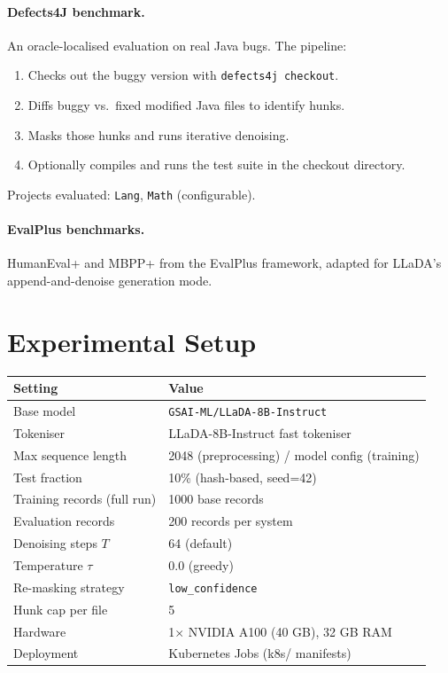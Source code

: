 \documentclass[11pt,a4paper]{article}
\begin{document}
\paragraph{Defects4J benchmark.} An oracle-localised evaluation on real Java bugs. The pipeline:
\begin{enumerate}[noitemsep]
  \item Checks out the buggy version with \texttt{defects4j checkout}.
  \item Diffs buggy vs.\ fixed modified Java files to identify hunks.
  \item Masks those hunks and runs iterative denoising.
  \item Optionally compiles and runs the test suite in the checkout directory.
\end{enumerate}
Projects evaluated: \texttt{Lang}, \texttt{Math} (configurable).

\paragraph{EvalPlus benchmarks.} HumanEval+ and MBPP+ from the EvalPlus framework, adapted for LLaDA's append-and-denoise generation mode.

\section{Experimental Setup}
\label{sec:setup}

\begin{center}
\begin{tabular}{ll}
\toprule
\textbf{Setting} & \textbf{Value} \\
\midrule
Base model & \texttt{GSAI-ML/LLaDA-8B-Instruct} \\
Tokeniser & LLaDA-8B-Instruct fast tokeniser \\
Max sequence length & 2048 (preprocessing) / model config (training) \\
Test fraction & 10\% (hash-based, seed=42) \\
Training records (full run) & 1000 base records \\
Evaluation records & 200 records per system \\
Denoising steps $T$ & 64 (default) \\
Temperature $\tau$ & 0.0 (greedy) \\
Re-masking strategy & \texttt{low\_confidence} \\
Hunk cap per file & 5 \\
Hardware & 1$\times$ NVIDIA A100 (40 GB), 32 GB RAM \\
Deployment & Kubernetes Jobs (k8s/ manifests) \\
\bottomrule
\end{tabular}
\end{center}
\end{document}
